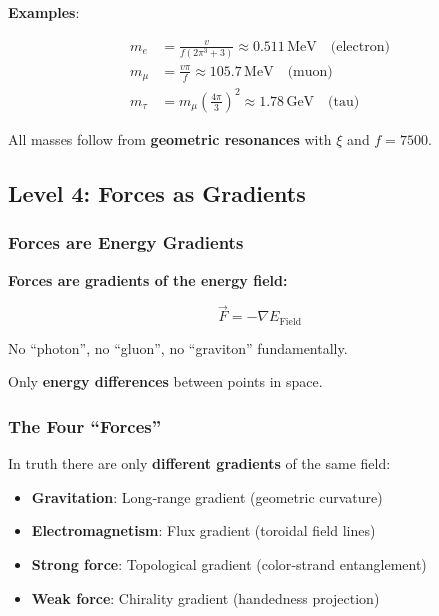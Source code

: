 	\textbf{Examples}:
	
	\begin{align}
		m_e &= \frac{v}{f(2\pi^3 + 3)} \approx 0.511\,\text{MeV} \quad \text{(electron)} \\
		m_\mu &= \frac{v\pi}{f} \approx 105.7\,\text{MeV} \quad \text{(muon)} \\
		m_\tau &= m_\mu \left(\frac{4\pi}{3}\right)^2 \approx 1.78\,\text{GeV} \quad \text{(tau)}
	\end{align}
	
	All masses follow from \textbf{geometric resonances} with $\xi$ and $f = 7500$.
	
	\subsection{Level 4: Forces as Gradients}
	
	\subsubsection{Forces are Energy Gradients}
	
	\begin{keyresult}
		\textbf{Forces are gradients of the energy field:}
		
		\begin{equation}
			\boxed{\vec{F} = -\nabla E_{\text{Field}}}
		\end{equation}
		
		\vspace{0.3cm}
		
		No \enquote{photon}, no \enquote{gluon}, no \enquote{graviton} fundamentally.
		
		Only \textbf{energy differences} between points in space.
	\end{keyresult}
	
	\subsubsection{The Four \enquote{Forces}}
	
	In truth there are only \textbf{different gradients} of the same field:
	
	\begin{itemize}
		\item \textbf{Gravitation}: Long‑range gradient (geometric curvature)
		\item \textbf{Electromagnetism}: Flux gradient (toroidal field lines)
		\item \textbf{Strong force}: Topological gradient (color‑strand entanglement)
		\item \textbf{Weak force}: Chirality gradient (handedness projection)
	\end{itemize}
	
